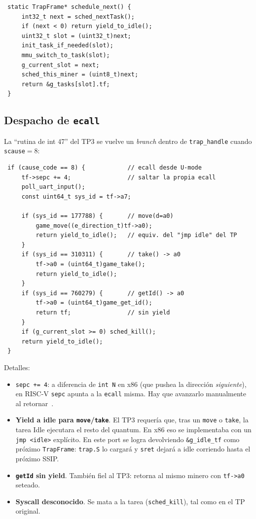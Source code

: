 \begin{codesnippet}
\begin{verbatim}
 static TrapFrame* schedule_next() {
     int32_t next = sched_nextTask();
     if (next < 0) return yield_to_idle();
     uint32_t slot = (uint32_t)next;
     init_task_if_needed(slot);
     mmu_switch_to_task(slot);
     g_current_slot = next;
     sched_this_miner = (uint8_t)next;
     return &g_tasks[slot].tf;
 }
\end{verbatim}
\end{codesnippet}

\subsection{Despacho de \texttt{ecall}}

La ``rutina de int 47'' del TP3 se vuelve un \emph{branch} dentro de \texttt{trap\_handle} cuando \texttt{scause}$=$8:

\begin{codesnippet}
\begin{verbatim}
 if (cause_code == 8) {            // ecall desde U-mode
     tf->sepc += 4;                // saltar la propia ecall
     poll_uart_input();
     const uint64_t sys_id = tf->a7;

     if (sys_id == 177788) {       // move(d=a0)
         game_move((e_direction_t)tf->a0);
         return yield_to_idle();   // equiv. del "jmp idle" del TP
     }
     if (sys_id == 310311) {       // take() -> a0
         tf->a0 = (uint64_t)game_take();
         return yield_to_idle();
     }
     if (sys_id == 760279) {       // getId() -> a0
         tf->a0 = (uint64_t)game_get_id();
         return tf;                // sin yield
     }
     if (g_current_slot >= 0) sched_kill();
     return yield_to_idle();
 }
\end{verbatim}
\end{codesnippet}

Detalles:

\begin{itemize}
  \item \texttt{sepc += 4}: a diferencia de \texttt{int N} en x86 (que pushea la dirección \emph{siguiente}), en RISC-V
  \texttt{sepc} apunta a la \texttt{ecall} misma. Hay que avanzarlo manualmente al retornar~\cite{riscv-priv}.

  \item \textbf{Yield a idle para \texttt{move}/\texttt{take}}. El TP3 requería que, tras un \texttt{move} o
  \texttt{take}, la tarea Idle ejecutara el resto del quantum. En x86 eso se implementaba con un \texttt{jmp <idle>}
  explícito. En este port se logra devolviendo \texttt{\&g\_idle\_tf} como próximo \texttt{TrapFrame}: \texttt{trap.S}
  lo cargará y \texttt{sret} dejará a idle corriendo hasta el próximo SSIP.

  \item \textbf{\texttt{getId} sin yield}. También fiel al TP3: retorna al mismo minero con \texttt{tf->a0} seteado.

  \item \textbf{Syscall desconocido}. Se mata a la tarea (\texttt{sched\_kill}), tal como en el TP original.
\end{itemize}

